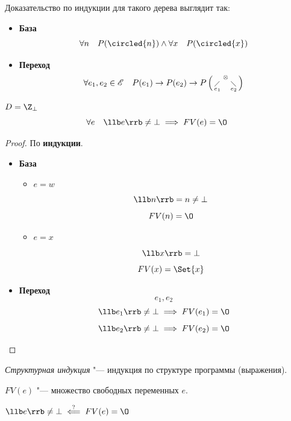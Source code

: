 Доказательство по индукции для такого дерева выглядит так:
\begin{itemize}
	\item \textbf{База}
		$$ \forall n \quad P(\circled{n}) \wedge \forall x \quad P(\circled{x}) $$
	\item \textbf{Переход}
		$$ \forall e_1, e_2 \in \mathscr E \quad P(e_1) \to P(e_2) \to P \left(
			\begin{smallmatrix}
				& \otimes & \\
				\diagup & & \diagdown \\
				e_1 & & e_2
		\end{smallmatrix} \right) $$
\end{itemize}

\begin{statement}
	$ D = \Z_\bot $
	$$ \forall e \quad \llb e \rrb \ne \bot \implies FV(e) = \O $$
\end{statement}

\begin{proof}
	По \textbf{индукции}.
	\begin{itemize}
		\item \textbf{База}
			\begin{itemize}
				\item $ e = w $
					$$ \llb n \rrb = n \ne \bot $$
					$$ FV(n) = \O $$
				\item $ e = x $
					$$ \llb x \rrb = \bot $$
					$$ FV(x) = \Set{x} $$
			\end{itemize}
		\item \textbf{Переход}
			$$ e_1, e_2 $$
			$$ \llb e_1 \rrb \ne \bot \implies FV(e_1) = \O $$
			$$ \llb e_2 \rrb \ne \bot \implies FV(e_2) = \O $$
	\end{itemize}
\end{proof}

\begin{definition}
	\emph{Структурная индукция} "--- индукция по структуре программы (выражения).
\end{definition}

\begin{notation}
	$ FV(e) $ "--- множество свободных переменных $ e $.
\end{notation}

\begin{statement}
	$ \llb e \rrb \ne \bot \stackrel?\impliedby FV(e) = \O $
\end{statement}

